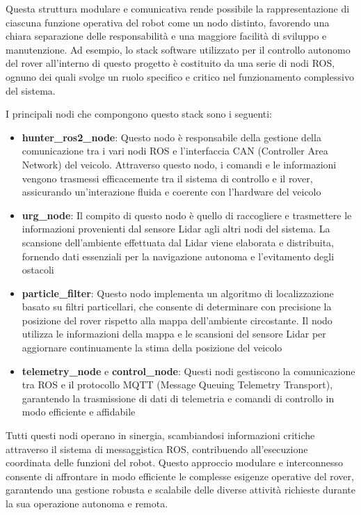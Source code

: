 \noindent Questa struttura modulare e comunicativa rende possibile la rappresentazione di ciascuna funzione operativa del robot come un nodo distinto, favorendo una chiara separazione delle responsabilità e una maggiore facilità di sviluppo e manutenzione. Ad esempio, lo stack software utilizzato per il controllo autonomo del rover all'interno di questo progetto è costituito da una serie di nodi ROS, ognuno dei quali svolge un ruolo specifico e critico nel funzionamento complessivo del sistema.

\noindent I principali nodi che compongono questo stack sono i seguenti:

\begin{itemize}
  \item \textbf{hunter\_ros2\_node}: Questo nodo è responsabile della gestione della comunicazione tra i vari nodi ROS e l'interfaccia CAN (Controller Area Network) del veicolo. Attraverso questo nodo, i comandi e le informazioni vengono trasmessi efficacemente tra il sistema di controllo e il rover, assicurando un'interazione fluida e coerente con l'hardware del veicolo

  \item \textbf{urg\_node}: Il compito di questo nodo è quello di raccogliere e trasmettere le informazioni provenienti dal sensore Lidar agli altri nodi del sistema. La scansione dell'ambiente effettuata dal Lidar viene elaborata e distribuita, fornendo dati essenziali per la navigazione autonoma e l'evitamento degli ostacoli

  \item \textbf{particle\_filter}: Questo nodo implementa un algoritmo di localizzazione basato su filtri particellari, che consente di determinare con precisione la posizione del rover rispetto alla mappa dell'ambiente circostante. Il nodo utilizza le informazioni della mappa e le scansioni del sensore Lidar per aggiornare continuamente la stima della posizione del veicolo

  \item \textbf{telemetry\_node} e \textbf{control\_node}: Questi nodi gestiscono la comunicazione tra ROS e il protocollo MQTT (Message Queuing Telemetry Transport), garantendo la trasmissione di dati di telemetria e comandi di controllo in modo efficiente e affidabile
\end{itemize}

\noindent Tutti questi nodi operano in sinergia, scambiandosi informazioni critiche attraverso il sistema di messaggistica ROS, contribuendo all'esecuzione coordinata delle funzioni del robot. Questo approccio modulare e interconnesso consente di affrontare in modo efficiente le complesse esigenze operative del rover, garantendo una gestione robusta e scalabile delle diverse attività richieste durante la sua operazione autonoma e remota.
